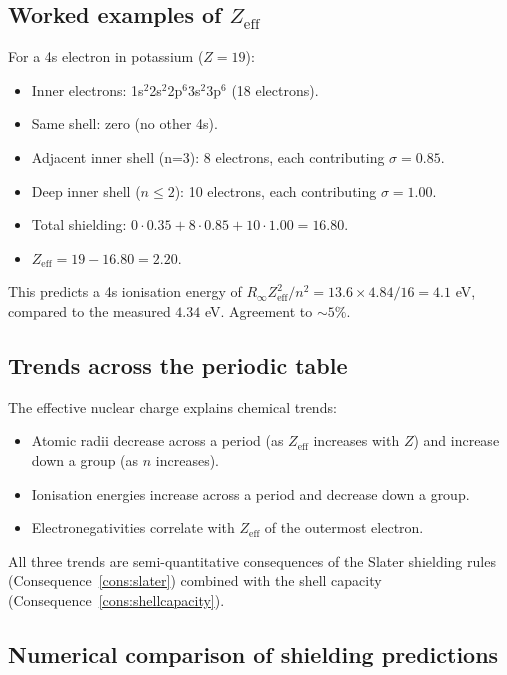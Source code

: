 \subsection{Worked examples of $Z_{\text{eff}}$}

For a 4s electron in potassium ($Z=19$):
\begin{itemize}
\item Inner electrons: 1s$^{2}$2s$^{2}$2p$^{6}$3s$^{2}$3p$^{6}$ (18 electrons).
\item Same shell: zero (no other 4s).
\item Adjacent inner shell (n=3): 8 electrons, each contributing $\sigma=0.85$.
\item Deep inner shell ($n\le 2$): 10 electrons, each contributing $\sigma=1.00$.
\item Total shielding: $0\cdot 0.35+8\cdot 0.85+10\cdot 1.00=16.80$.
\item $Z_{\text{eff}}=19-16.80=2.20$.
\end{itemize}
This predicts a 4s ionisation energy of $R_{\infty}Z_{\text{eff}}^{2}/n^{2}=13.6\times 4.84/16=4.1$ eV, compared to the measured $4.34$ eV. Agreement to $\sim 5\%$.

\subsection{Trends across the periodic table}

The effective nuclear charge explains chemical trends:
\begin{itemize}
\item Atomic radii decrease across a period (as $Z_{\text{eff}}$ increases with $Z$) and increase down a group (as $n$ increases).
\item Ionisation energies increase across a period and decrease down a group.
\item Electronegativities correlate with $Z_{\text{eff}}$ of the outermost electron.
\end{itemize}
All three trends are semi-quantitative consequences of the Slater shielding rules (Consequence~\ref{cons:slater}) combined with the shell capacity (Consequence~\ref{cons:shellcapacity}).

\subsection{Numerical comparison of shielding predictions}

